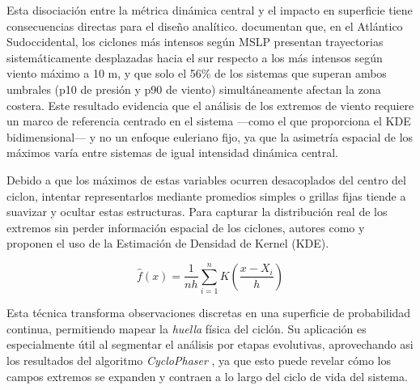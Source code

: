 Esta disociación entre la métrica dinámica central y el impacto en superficie tiene consecuencias directas para el diseño analítico. \citet{andrade2024composite} documentan que, en el Atlántico Sudoccidental, los ciclones más intensos según MSLP presentan trayectorias sistemáticamente desplazadas hacia el sur respecto a los más intensos según viento máximo a 10 m, y que solo el 56\% de los sistemas que superan ambos umbrales (p10 de presión y p90 de viento) simultáneamente afectan la zona costera. Este resultado evidencia que el análisis de los extremos de viento requiere un marco de referencia centrado en el sistema —como el que proporciona el KDE bidimensional— y no un enfoque euleriano fijo, ya que la asimetría espacial de los máximos varía entre sistemas de igual intensidad dinámica central.

Debido a que los máximos de estas variables ocurren desacoplados del centro del ciclon, intentar representarlos mediante promedios simples o grillas fijas tiende a suavizar y ocultar estas estructuras. Para capturar la distribución real de los extremos sin perder información espacial de los ciclones, autores como \citet{priestley2022improved} y \citet{han2025system} proponen el uso de la Estimación de Densidad de Kernel (KDE).

\begin{equation}
\hat{f}(x) = \frac{1}{nh} \sum_{i=1}^{n} K\left(\frac{x - X_i}{h}\right)
\end{equation}

Esta técnica transforma observaciones discretas en una superficie de probabilidad continua, permitiendo mapear la \textit{huella} física del ciclón. Su aplicación es especialmente útil al segmentar el análisis por etapas evolutivas, aprovechando asi los resultados del algoritmo \textit{CycloPhaser} \citep{coutodesouza2024new}, ya que esto puede revelar cómo los campos extremos se expanden y contraen a lo largo del ciclo de vida del sistema.

